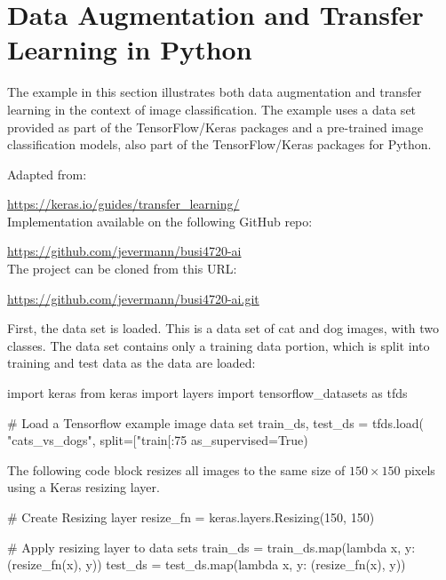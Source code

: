 \FloatBarrier

\section{Data Augmentation and Transfer Learning in Python}

The example in this section illustrates both data augmentation and transfer learning in the context of image classification. The example uses a data set provided as part of the TensorFlow/Keras packages and a pre-trained image classification models, also part of the TensorFlow/Keras packages for Python. 

\begin{resourcebox}
Adapted from: 

\small\url{https://keras.io/guides/transfer_learning/}\normalsize \\

Implementation available on the following GitHub repo:

\small\url{https://github.com/jevermann/busi4720-ai}\normalsize \\

The project can be cloned from this URL:

\small\url{https://github.com/jevermann/busi4720-ai.git}\normalsize
\end{resourcebox}

First, the data set is loaded. This is a data set of cat and dog images, with two classes. The data set contains only a training data portion, which is split into training and test data as the data are loaded:

\begin{pythoncode}
import keras
from keras import layers
import tensorflow_datasets as tfds

# Load a Tensorflow example image data set
train_ds, test_ds = tfds.load(
    "cats_vs_dogs",
    split=["train[:75%
    as_supervised=True)
\end{pythoncode}

The following code block resizes all images to the same size of $150 \times 150$ pixels using a Keras resizing layer.
\begin{pythoncode}
# Create Resizing layer
resize_fn = keras.layers.Resizing(150, 150)

# Apply resizing layer to data sets
train_ds = train_ds.map(lambda x, y: (resize_fn(x), y))
test_ds = test_ds.map(lambda x, y: (resize_fn(x), y))
\end{pythoncode}

